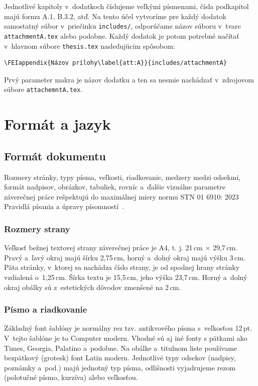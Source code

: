 Jednotlivé kapitoly v~dodatkoch číslujeme veľkými písmenami, čísla podkapitol majú formu A.1, B.3.2, atď.
Na tento účel vytvoríme pre každý dodatok samostatný súbor v~priečinku \verb|includes/|, odporúčame názov súboru v~tvare \verb|attachmentA.tex| alebo podobne.
Každý dodatok je potom potrebné načítať v~hlavnom súbore \verb|thesis.tex| nasledujúcim spôsobom:
\begin{verbatim}
\FEIappendix{Názov prílohy\label{att:A}}{includes/attachmentA}
\end{verbatim}
Prvý parameter makra je názov dodatku a ten sa nesmie nachádzať v~zdrojovom súbore \verb|attachemntA.tex|.

\section{Formát a jazyk}\label{sec:formatLanguage}
\subsection{Formát dokumentu}
Rozmery stránky, typy písma, veľkosti, riadkovanie,
medzery medzi odsekmi, formát nadpisov, obrázkov, tabuliek,
rovníc a~ďalšie vizuálne parametre záverečnej práce
rešpektujú do maximálnej miery normu STN 01 6910: 2023
Pravidlá písania a úpravy písomností~\cite{stn016910}.

\subsubsection*{Rozmery strany}
Veľkosť bežnej textovej strany záverečnej práce je A4,
t. j. 21\,cm $\times$ 29,7\,cm.
Pravý a~ľavý okraj majú šírku 2,75\,cm,
horný a~dolný okraj majú výšku 3\,cm.
Päta stránky, v~ktorej sa nachádza číslo strany,
je od spodnej hrany stránky vzdialená o~1,25\,cm.
Šírka textu je 15,5\,cm, jeho výška 23,7\,cm.
Horný a~dolný okraj obálky sú z~estetických
dôvodov zmenšené na 2\,cm.

\subsubsection*{Písmo a riadkovanie}
Základný font šablóny je normálny rez tzv. antikvového písma
s~veľkosťou 12\,pt.
V~tejto šablóne je to Computer modern.
Vhodné sú aj iné fonty s pätkami ako Times, Georgia, Palatino a~podobne.
Na obálke a~titulnom liste používame bezpätkový (grotesk) font Latin modern. 
Jednotlivé typy odsekov (nadpisy, poznámky a~pod.)
majú jednotný typ písma,
odlišnosti vyjadrujeme rezom (polotučné písmo, kurzíva)
alebo veľkosťou.


